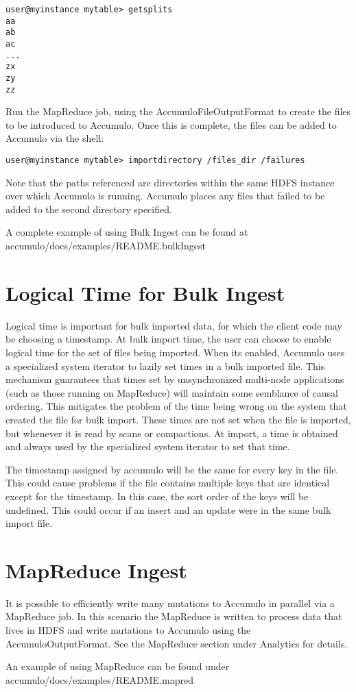 \small
\begin{verbatim}
user@myinstance mytable> getsplits
aa
ab
ac
...
zx
zy
zz
\end{verbatim}
\normalsize

Run the MapReduce job, using the AccumuloFileOutputFormat to create the files to
be introduced to Accumulo. Once this is complete, the files can be added to
Accumulo via the shell:

\small
\begin{verbatim}
user@myinstance mytable> importdirectory /files_dir /failures
\end{verbatim}
\normalsize

Note that the paths referenced are directories within the same HDFS instance over
which Accumulo is running. Accumulo places any files that failed to be added to the
second directory specified.

A complete example of using Bulk Ingest can be found at\\
accumulo/docs/examples/README.bulkIngest

\section{Logical Time for Bulk Ingest}

Logical time is important for bulk imported data, for which the client code may
be choosing a timestamp. At bulk import time, the user can choose to enable
logical time for the set of files being imported.  When its enabled, Accumulo
uses a specialized system iterator to lazily set times in a bulk imported file.
This mechanism guarantees that times set by unsynchronized multi-node
applications (such as those running on MapReduce) will maintain some semblance
of causal ordering. This mitigates the problem of the time being wrong on the
system that created the file for bulk import. These times are not set when the
file is imported, but whenever it is read by scans or compactions. At import, a
time is obtained and always used by the specialized system iterator to set that
time.

The timestamp assigned by accumulo will be the same for every key in the file.
This could cause problems if the file contains multiple keys that are identical
except for the timestamp.  In this case, the sort order of the keys will be
undefined. This could occur if an insert and an update were in the same bulk
import file.

\section{MapReduce Ingest}
It is possible to efficiently write many mutations to Accumulo in parallel via a
MapReduce job. In this scenario the MapReduce is written to process data that lives
in HDFS and write mutations to Accumulo using the AccumuloOutputFormat. See
the MapReduce section under Analytics for details.

An example of using MapReduce can be found under\\
accumulo/docs/examples/README.mapred

